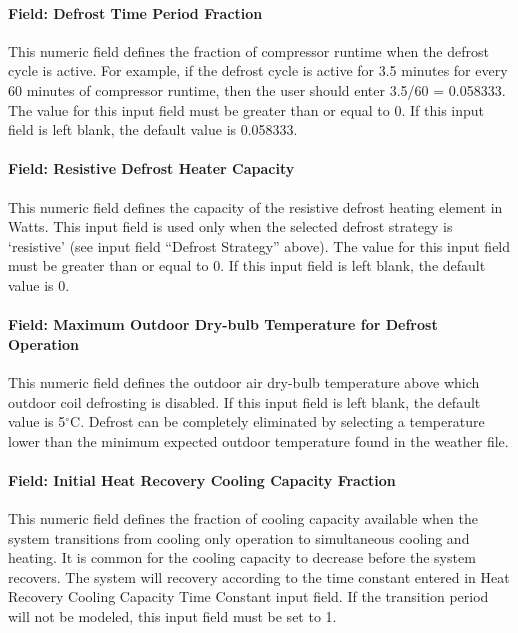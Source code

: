 \paragraph{Field: Defrost Time Period Fraction}

This numeric field defines the fraction of compressor runtime when the defrost cycle is active. For example, if the defrost cycle is active for 3.5 minutes for every 60 minutes of compressor runtime, then the user should enter 3.5/60 = 0.058333. The value for this input field must be greater than or equal to 0. If this input field is left blank, the default value is 0.058333.

\paragraph{Field: Resistive Defrost Heater Capacity}

This numeric field defines the capacity of the resistive defrost heating element in Watts. This input field is used only when the selected defrost strategy is `resistive' (see input field ``Defrost Strategy'' above). The value for this input field must be greater than or equal to 0. If this input field is left blank, the default value is 0.

\paragraph{Field: Maximum Outdoor Dry-bulb Temperature for Defrost Operation}

This numeric field defines the outdoor air dry-bulb temperature above which outdoor coil defrosting is disabled. If this input field is left blank, the default value is 5$^\circ$C. Defrost can be completely eliminated by selecting a temperature lower than the minimum expected outdoor temperature found in the weather file.

\paragraph{Field: Initial Heat Recovery Cooling Capacity Fraction}

This numeric field defines the fraction of cooling capacity available when the system transitions from cooling only operation to simultaneous cooling and heating. It is common for the cooling capacity to decrease before the system recovers. The system will recovery according to the time constant entered in Heat Recovery Cooling Capacity Time Constant input field. If the transition period will not be modeled, this input field must be set to 1.

